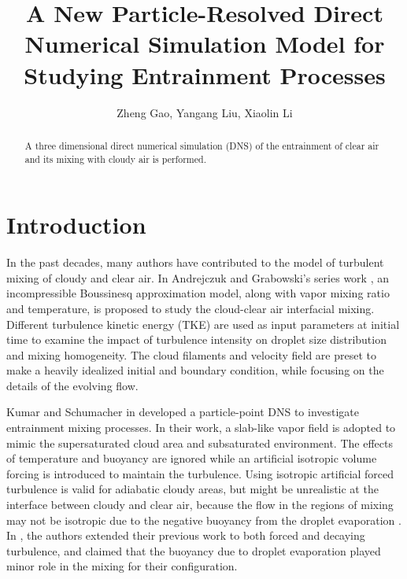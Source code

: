 \documentclass[12pt]{article}
\begin{document}
\title{A New Particle-Resolved Direct Numerical Simulation Model for Studying Entrainment Processes}
\author{Zheng Gao,
Yangang Liu,
Xiaolin Li}
\maketitle


\begin{abstract}
A three dimensional direct numerical simulation (DNS) of the entrainment 
of clear air and its mixing with cloudy air is performed. 
\end{abstract}

\section{Introduction}
In the past decades, many authors have contributed to the model of
turbulent mixing of cloudy and clear air. In Andrejczuk and Grabowski's series work \cite{And04,And06,And09}, an incompressible Boussinesq approximation model, along with vapor mixing ratio and temperature, is proposed to study the cloud-clear air interfacial mixing. Different turbulence kinetic energy (TKE) are used as input parameters at initial time to examine the impact of turbulence intensity on droplet size distribution and mixing homogeneity. The cloud filaments and velocity field are preset to make a heavily idealized initial and boundary condition, while focusing on the details of the evolving flow. 

Kumar and Schumacher in \cite{Kumar11,Kumar12} developed a particle-point DNS to investigate entrainment mixing processes. In their work, a slab-like vapor field is adopted to mimic the supersaturated cloud area and subsaturated environment. The effects of temperature and buoyancy are ignored while an artificial isotropic volume forcing is introduced to maintain the turbulence. Using isotropic artificial forced turbulence is valid for adiabatic cloudy areas, but might be unrealistic at the interface between cloudy and clear air, because the flow in the regions of mixing may not be isotropic due to the negative buoyancy from the droplet evaporation \cite{Vaillancourt00}. In \cite{Kumar14}, the authors extended their previous work to both forced and decaying turbulence, and claimed that the buoyancy due to droplet evaporation played minor role in the mixing for their configuration.
\end{document}
